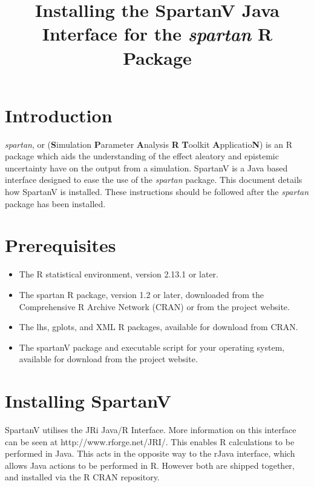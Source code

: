 \documentclass[a4paper,11pt]{article}
\title{\huge \textbf{Installing the SpartanV Java Interface for the \textit{spartan} R Package}\\
\date{}
}
\begin{document}
\maketitle


\section{Introduction}
\noindent \textit{spartan}, or (\textbf{S}imulation \textbf{P}arameter \textbf{A}nalysis \textbf{R} \textbf{T}oolkit \textbf{A}pplicatio\textbf{N}) is an R package which aids the understanding of the effect aleatory and epistemic uncertainty have on the output from a simulation. SpartanV is a Java based interface designed to ease the use of the \textit{spartan} package. This document details how SpartanV is installed. These instructions should be followed after the \textit{spartan} package has been installed.

\section{Prerequisites}
\begin{itemize}
\item The R statistical environment, version 2.13.1 or later.
\item The spartan R package, version 1.2 or later, downloaded from the Comprehensive R Archive Network (CRAN) or from the project website.
\item The lhs, gplots, and XML R packages, available for download from CRAN.
\item The spartanV package and executable script for your operating system, available for download from the project website.
\end{itemize}

\section{Installing SpartanV}

\noindent SpartanV utilises the JRi Java/R Interface. More information on this interface can be seen at http://www.rforge.net/JRI/. This enables R calculations to be performed in Java. This acts in the opposite way to the rJava interface, which allows Java actions to be performed in R. However both are shipped together, and installed via the R CRAN repository.
\end{document}
